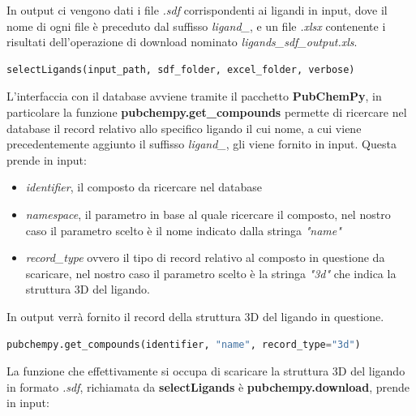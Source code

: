 In output ci vengono dati i file \textit{.sdf} corrispondenti ai ligandi in input, dove il nome di ogni file è preceduto dal suffisso \textit{ligand\_}, e un file \textit{.xlsx} contenente i risultati dell'operazione di download nominato \textit{ligands\_sdf\_output.xls}.

\begin{lstlisting}[language=Python, label=lst:code4, caption={funzione selectLigands}]
selectLigands(input_path, sdf_folder, excel_folder, verbose)
\end{lstlisting}

L'interfaccia con il database avviene tramite il pacchetto \textbf{PubChemPy}, in particolare la funzione \textbf{pubchempy.get\_compounds} permette di ricercare nel database il record relativo allo specifico ligando il cui nome, a cui viene precedentemente aggiunto il suffisso \textit{ligand\_}, gli viene fornito in input. Questa prende in input:

\begin{itemize}
    \item \textit{identifier}, il composto da ricercare nel database
    \item \textit{namespace}, il parametro in base al quale ricercare il composto, nel nostro caso il parametro scelto è il nome indicato dalla stringa \textit{"name"}
    \item \textit{record\_type} ovvero il tipo di record relativo al composto in questione da scaricare, 
    nel nostro caso il parametro scelto è la stringa \textit{"3d"} che indica la struttura 3D del ligando.
\end{itemize}

In output verrà fornito il record della struttura 3D del ligando in questione.

\begin{lstlisting}[language=Python, label=lst:code5, caption={funzione pubchempy.get\_compounds}]
pubchempy.get_compounds(identifier, "name", record_type="3d")
\end{lstlisting}

La funzione che effettivamente si occupa di scaricare la struttura 3D del ligando in formato \textit{.sdf}, richiamata da \textbf{selectLigands} è \textbf{pubchempy.download}, prende in input:

